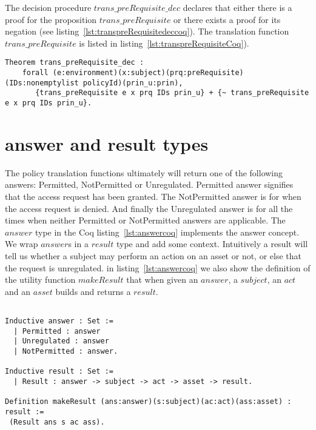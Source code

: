 The decision procedure $trans\_preRequisite\_dec$ declares that either there is a proof for the proposition $trans\_preRequisite$ or there exists a proof for its negation (see listing~\ref{lst:transpreRequisitedeccoq}). The translation function $trans\_preRequisite$ is listed in listing~\ref{lst:transpreRequisiteCoq}). 


\begin{lstlisting}
Theorem trans_preRequisite_dec :
    forall (e:environment)(x:subject)(prq:preRequisite)(IDs:nonemptylist policyId)(prin_u:prin),
       {trans_preRequisite e x prq IDs prin_u} + {~ trans_preRequisite e x prq IDs prin_u}.
\end{lstlisting}


\section{answer and result types}\label{sec:answerandresulttypes}

The policy translation functions ultimately will return one of the following answers: Permitted, NotPermitted or Unregulated. Permitted answer signifies that the access request has been granted. The NotPermitted answer is for when the access request is denied. And finally the Unregulated answer is for all the times when neither Permitted or NotPermitted answers are applicable. The $answer$ type in the Coq listing~\ref{lst:answercoq} implements the answer concept. We wrap $answer$s in a $result$ type and add some context. Intuitively a result will tell us whether a subject may perform an action on an asset or not, or else that the request is unregulated. in listing~\ref{lst:answercoq} we also show the definition of the utility function $makeResult$ that when given an $answer$, a $subject$, an $act$ and an $asset$ builds and returns a $result$.


\begin{minipage}[c]{0.95\textwidth}
\begin{lstlisting}

Inductive answer : Set :=
  | Permitted : answer
  | Unregulated : answer
  | NotPermitted : answer.
  
Inductive result : Set :=
  | Result : answer -> subject -> act -> asset -> result.
 
Definition makeResult (ans:answer)(s:subject)(ac:act)(ass:asset) : result := 
 (Result ans s ac ass).
 
\end{lstlisting}
\end{minipage}

